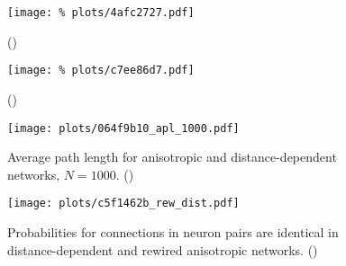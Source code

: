 
\begin{figure}[H]
  \vspace{-1.2cm}
  \centering
  \texttt{[image: \%
    plots/4afc2727.pdf]}
  \captionsetup{skip=-7pt}
  \caption{\label{suppfig:rew_stats}()}

  \vspace{0.5cm}
  \captionsetup{skip=-1pt}
  \texttt{[image: \%
    plots/c7ee86d7.pdf]}
  \caption{\label{suppfig:out_degree}()}
  
  \vspace{0.5cm} 
  \texttt{[image: plots/064f9b10\_apl\_1000.pdf]}  
  \caption{\label{suppfig:small_world}Average path length for
    anisotropic and distance-dependent networks,
    $N=1000$. ()}

  \vspace{0.5cm}
 \captionsetup{skip=2pt}
  \texttt{[image: plots/c5f1462b\_rew\_dist.pdf]}
  \caption{\label{suppfig:two_neurons_dist_rew}Probabilities for
    connections in neuron pairs are identical in distance-dependent
    and rewired anisotropic networks. ()}

\end{figure}


